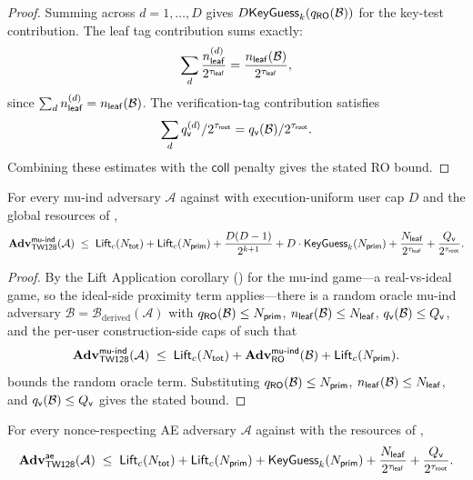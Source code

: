 \begin{proof}
Summing across $d = 1,\dots,D$ gives
$D \mathsf{KeyGuess}_k(q_{\mathsf{RO}}(\mathcal{B}))$ for the key-test contribution. The
leaf tag contribution sums exactly:
\[
  \sum_d \frac{n_{\mathsf{leaf}}^{(d)}}{2^{\tau_{\mathsf{leaf}}}}
  = \frac{n_{\mathsf{leaf}}(\mathcal{B})}{2^{\tau_{\mathsf{leaf}}}},
\]
since $\sum_d n_{\mathsf{leaf}}^{(d)} = n_{\mathsf{leaf}}(\mathcal{B})$. The
verification-tag contribution satisfies
\[
  \sum_d q_{\mathsf{v}}^{(d)} / 2^{\tau_{\mathsf{root}}}
  = q_{\mathsf{v}}(\mathcal{B}) / 2^{\tau_{\mathsf{root}}}.
\]
Combining these estimates with the $\mathsf{coll}$ penalty gives the
stated RO bound.
\end{proof}

\begin{theorem}
\label{thm:mu-ind}
For every mu-ind adversary $\mathcal{A}$ against \TW{} with
execution-uniform user cap $D$ and the global resources of
,
\[
  \mathbf{Adv}^{\mathsf{mu\text{-}ind}}_{\textsf{TW128}}(\mathcal{A})
  \;\leq\;
  \mathsf{Lift}_c(N_{\mathsf{tot}})
  + \mathsf{Lift}_c(N_{\mathsf{prim}})
  + \frac{D(D - 1)}{2^{k + 1}}
  + D \cdot \mathsf{KeyGuess}_k(N_{\mathsf{prim}})
  + \frac{N_{\mathsf{leaf}}}{2^{\tau_{\mathsf{leaf}}}}
  + \frac{Q_{\mathsf{v}}}{2^{\tau_{\mathsf{root}}}}.
\]
\end{theorem}

\begin{proof}
By the Lift Application corollary () for the
mu-ind game---a real-vs-ideal game, so the ideal-side proximity term
applies---there is a random oracle mu-ind adversary
$\mathcal{B} = \mathcal{B}_{\mathrm{derived}}(\mathcal{A})$ with
$q_{\mathsf{RO}}(\mathcal{B}) \leq N_{\mathsf{prim}}$, $n_{\mathsf{leaf}}(\mathcal{B}) \leq N_{\mathsf{leaf}}$,
$q_{\mathsf{v}}(\mathcal{B}) \leq Q_{\mathsf{v}}$, and the per-user construction-side caps of
 such that
\[
  \mathbf{Adv}^{\mathsf{mu\text{-}ind}}_{\textsf{TW128}}(\mathcal{A})
  \;\leq\;
  \mathsf{Lift}_c(N_{\mathsf{tot}}) + \mathbf{Adv}^{\mathsf{mu\text{-}ind}}_{\mathsf{RO}}(\mathcal{B})
  + \mathsf{Lift}_c(N_{\mathsf{prim}}).
\]
 bounds the random oracle term. Substituting
$q_{\mathsf{RO}}(\mathcal{B}) \leq N_{\mathsf{prim}}$,
$n_{\mathsf{leaf}}(\mathcal{B}) \leq N_{\mathsf{leaf}}$, and
$q_{\mathsf{v}}(\mathcal{B}) \leq Q_{\mathsf{v}}$ gives the stated bound.
\end{proof}

\begin{corollary}
\label{cor:ae}
For every nonce-respecting AE adversary $\mathcal{A}$ against \TW{}
with the resources of ,
\[
  \mathbf{Adv}^{\mathsf{ae}}_{\textsf{TW128}}(\mathcal{A})
  \;\leq\;
  \mathsf{Lift}_c(N_{\mathsf{tot}})
  + \mathsf{Lift}_c(N_{\mathsf{prim}})
  + \mathsf{KeyGuess}_k(N_{\mathsf{prim}})
  + \frac{N_{\mathsf{leaf}}}{2^{\tau_{\mathsf{leaf}}}}
  + \frac{Q_{\mathsf{v}}}{2^{\tau_{\mathsf{root}}}}.
\]
\end{corollary}


